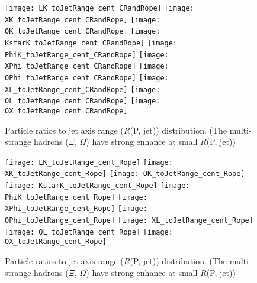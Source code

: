 \begin{figure}[ht]
\begin{center}
	\texttt{[image: LK\_toJetRange\_cent\_CRandRope]}
	\texttt{[image: XK\_toJetRange\_cent\_CRandRope]}
	\texttt{[image: OK\_toJetRange\_cent\_CRandRope]}
	\texttt{[image: KstarK\_toJetRange\_cent\_CRandRope]}
	\texttt{[image: PhiK\_toJetRange\_cent\_CRandRope]}
	\texttt{[image: XPhi\_toJetRange\_cent\_CRandRope]}
	\texttt{[image: OPhi\_toJetRange\_cent\_CRandRope]}
	\texttt{[image: XL\_toJetRange\_cent\_CRandRope]}
	\texttt{[image: OL\_toJetRange\_cent\_CRandRope]}
	\texttt{[image: OX\_toJetRange\_cent\_CRandRope]}
\end{center}
\caption{Particle ratios to jet axis range ($R$(P, jet)) distribution. (The multi-strange hadrons ($\Xi$, $\Omega$) have strong enhance at small $R$(P, jet))}
\label{fig:ParRatiotoJetCRandRope}
\end{figure}
\begin{figure}[ht]
\begin{center}
	\texttt{[image: LK\_toJetRange\_cent\_Rope]}
	\texttt{[image: XK\_toJetRange\_cent\_Rope]}
	\texttt{[image: OK\_toJetRange\_cent\_Rope]}
	\texttt{[image: KstarK\_toJetRange\_cent\_Rope]}
	\texttt{[image: PhiK\_toJetRange\_cent\_Rope]}
	\texttt{[image: XPhi\_toJetRange\_cent\_Rope]}
	\texttt{[image: OPhi\_toJetRange\_cent\_Rope]}
	\texttt{[image: XL\_toJetRange\_cent\_Rope]}
	\texttt{[image: OL\_toJetRange\_cent\_Rope]}
	\texttt{[image: OX\_toJetRange\_cent\_Rope]}
\end{center}
\caption{Particle ratios to jet axis range ($R$(P, jet)) distribution. (The multi-strange hadrons ($\Xi$, $\Omega$) have strong enhance at small $R$(P, jet))}
\label{fig:ParRatiotoJetRope}
\end{figure}